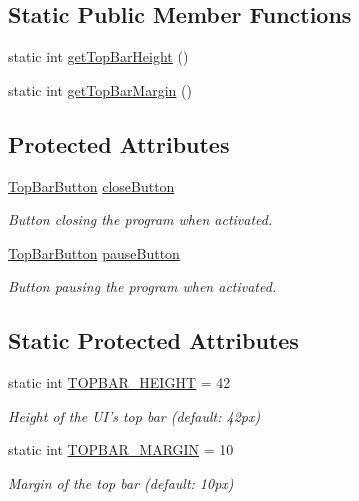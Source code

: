 \subsection*{Static Public Member Functions}
\begin{DoxyCompactItemize}
\item 
static int \hyperlink{a00031_a847fe55578ff23c63533ff68168c8fed}{get\-Top\-Bar\-Height} ()
\item 
static int \hyperlink{a00031_adfdb55a34a781ed9c1c28dcc820b10e3}{get\-Top\-Bar\-Margin} ()
\end{DoxyCompactItemize}
\subsection*{Protected Attributes}
\begin{DoxyCompactItemize}
\item 
\hyperlink{a00032}{Top\-Bar\-Button} \hyperlink{a00031_a98271c11b9bbb79d1e79e03752d4e0b4}{close\-Button}
\begin{DoxyCompactList}\small\item\em Button closing the program when activated. \end{DoxyCompactList}\item 
\hyperlink{a00032}{Top\-Bar\-Button} \hyperlink{a00031_ac7b4f88657cb97d1ae3df6a99d3694e9}{pause\-Button}
\begin{DoxyCompactList}\small\item\em Button pausing the program when activated. \end{DoxyCompactList}\end{DoxyCompactItemize}
\subsection*{Static Protected Attributes}
\begin{DoxyCompactItemize}
\item 
static int \hyperlink{a00031_aa7100cb3da5276c12e4fae659823bf4e}{T\-O\-P\-B\-A\-R\-\_\-\-H\-E\-I\-G\-H\-T} = 42
\begin{DoxyCompactList}\small\item\em Height of the U\-I's top bar (default\-: 42px) \end{DoxyCompactList}\item 
static int \hyperlink{a00031_a8d48486507d36a825223a21b1b6333ac}{T\-O\-P\-B\-A\-R\-\_\-\-M\-A\-R\-G\-I\-N} = 10
\begin{DoxyCompactList}\small\item\em Margin of the top bar (default\-: 10px) \end{DoxyCompactList}\end{DoxyCompactItemize}


